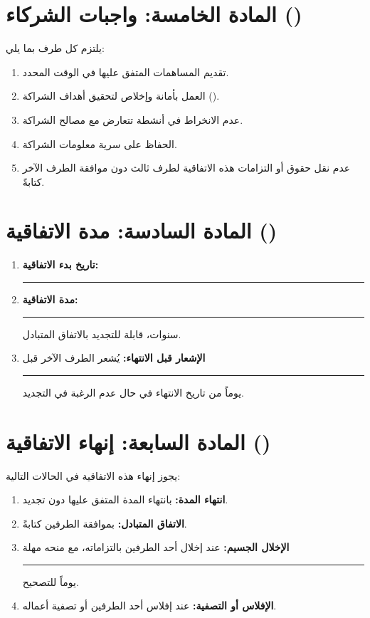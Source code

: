 \documentclass[12pt,a4paper]{article}
\begin{document}
\section{المادة الخامسة: واجبات الشركاء ()}
\label{sec:duties}
يلتزم كل طرف بما يلي:
\begin{enumerate}
    \item تقديم المساهمات المتفق عليها في الوقت المحدد.
    \item العمل بأمانة وإخلاص لتحقيق أهداف الشراكة ().
    \item عدم الانخراط في أنشطة تتعارض مع مصالح الشراكة.
    \item الحفاظ على سرية معلومات الشراكة.
    \item عدم نقل حقوق أو التزامات هذه الاتفاقية لطرف ثالث دون موافقة الطرف الآخر كتابةً.
\end{enumerate}

\section{المادة السادسة: مدة الاتفاقية ()}
\label{sec:term}
\begin{enumerate}
    \item \textbf{تاريخ بدء الاتفاقية:} \rule{4cm}{0.4pt}
    \item \textbf{مدة الاتفاقية:} \rule{2cm}{0.4pt} سنوات، قابلة للتجديد بالاتفاق المتبادل.
    \item \textbf{الإشعار قبل الانتهاء:} يُشعر الطرف الآخر قبل \rule{2cm}{0.4pt} يوماً من تاريخ الانتهاء في حال عدم الرغبة في التجديد.
\end{enumerate}

\section{المادة السابعة: إنهاء الاتفاقية ()}
\label{sec:termination}
يجوز إنهاء هذه الاتفاقية في الحالات التالية:
\begin{enumerate}
    \item \textbf{انتهاء المدة:} بانتهاء المدة المتفق عليها دون تجديد.
    \item \textbf{الاتفاق المتبادل:} بموافقة الطرفين كتابةً.
    \item \textbf{الإخلال الجسيم:} عند إخلال أحد الطرفين بالتزاماته، مع منحه مهلة \rule{2cm}{0.4pt} يوماً للتصحيح.
    \item \textbf{الإفلاس أو التصفية:} عند إفلاس أحد الطرفين أو تصفية أعماله.
\end{enumerate}
\end{document}
